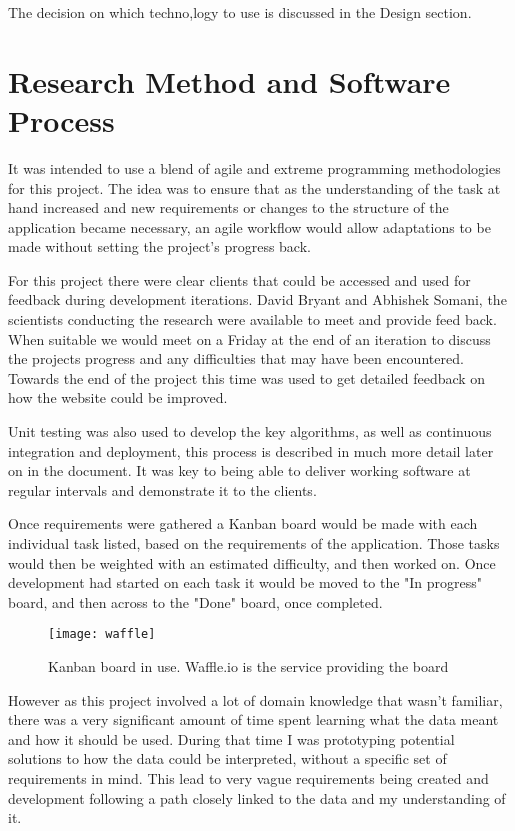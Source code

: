 The decision on which techno,logy to use is discussed in the Design section. 

\section{Research Method and Software Process}
It was intended to use a blend of agile and extreme programming methodologies for this project. The idea was to ensure that as the understanding of the task at hand increased and new requirements or changes to the structure of the application became necessary, an agile workflow would allow adaptations to be made without setting the project's progress back. 

For this project there were clear clients that could be accessed and used for feedback during development iterations. David Bryant and Abhishek Somani, the scientists conducting the research were available to meet and provide feed back. When suitable we would meet on a Friday at the end of an iteration to discuss the projects progress and any difficulties that may have been encountered. Towards the end of the project this time was used to get detailed feedback on how the website could be improved. 

Unit testing was also used to develop the key algorithms, as well as continuous integration and deployment, this process is described in much more detail later on in the document. It was key to being able to deliver working software at regular intervals and demonstrate it to the clients. 

Once requirements were gathered a Kanban board would be made with each individual task listed, based on the requirements of the application. Those tasks would then be weighted with an estimated difficulty, and then worked on. Once development had started on each task it would be moved to the "In progress" board, and then across to the "Done" board, once completed. 

\begin{figure}[ht!]
\begin{center}
\texttt{[image: waffle]}
\caption{Kanban board in use. Waffle.io is the service providing the board}
\end{center}
\end{figure}

However as this project involved a lot of domain knowledge that wasn't familiar, there was a very significant amount of time spent learning what the data meant and how it should be used. During that time I was prototyping potential solutions to how the data could be interpreted, without a specific set of requirements in mind. This lead to very vague requirements being created and development following a path closely linked to the data and my understanding of it. 

